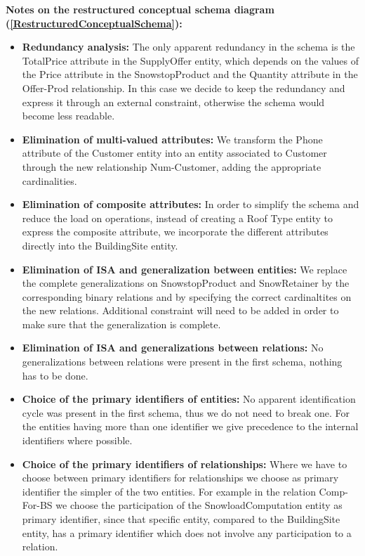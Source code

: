 \documentclass{article}[h]
\begin{document}
\textbf{Notes on the restructured conceptual schema diagram (\ref{RestructuredConceptualSchema}):\\}
\begin{itemize}
  \item \textbf{Redundancy analysis:}
  The only apparent redundancy in the schema is the TotalPrice attribute in the SupplyOffer entity, which depends on the values of the Price attribute in the SnowstopProduct and the Quantity attribute in the Offer-Prod relationship. In this case we decide to keep the redundancy and express it through an external constraint, otherwise the schema would become less readable.
  \item \textbf{Elimination of multi-valued attributes:}
  We transform the Phone attribute of the Customer entity into an entity associated to Customer through the new relationship Num-Customer, adding the appropriate cardinalities.
  \item \textbf{Elimination of composite attributes:}
  In order to simplify the schema and reduce the load on operations, instead of creating a Roof Type entity to express the composite attribute, we incorporate the different attributes directly into the BuildingSite entity.
  \item \textbf{Elimination of ISA and generalization between entities:}
  We replace the complete generalizations on SnowstopProduct and SnowRetainer by the corresponding binary relations and by specifying the correct cardinaltites on the new relations. Additional constraint will need to be added in order to make sure that the generalization is complete. 
  \item \textbf{Elimination of ISA and generalizations between relations:}
  No generalizations between relations were present in the first schema, nothing has to be done.
  \item \textbf{Choice of the primary identifiers of entities:}
  No apparent identification cycle was present in the first schema, thus we do not need to break one. For the entities having more than one identifier we give precedence to the internal identifiers where possible.
  \item \textbf{Choice of the primary identifiers of relationships:}
  Where we have to choose between primary identifiers for relationships we choose as primary identifier the simpler of the two entities. For example in the relation Comp-For-BS we choose the participation of the SnowloadComputation entity as primary identifier, since that specific entity, compared to the BuildingSite entity, has a primary identifier which does not involve any participation to a relation.
\end{itemize}
\end{document}
